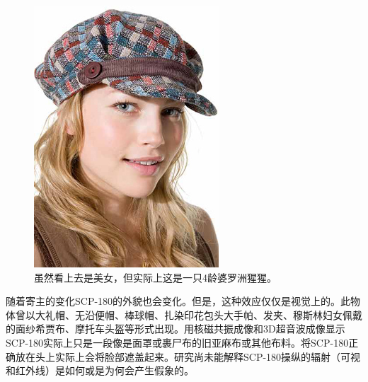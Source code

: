 \begin{figure}[H]
    \centering
    \includegraphics[width=0.5\linewidth]{images/SCP-180-2.jpg}
    \caption*{虽然看上去是美女，但实际上这是一只4龄婆罗洲猩猩。}
\end{figure}

随着寄主的变化SCP-180的外貌也会变化。但是，这种效应仅仅是视觉上的。此物体曾以大礼帽、无沿便帽、棒球帽、扎染印花包头大手帕、发夹、穆斯林妇女佩戴的面纱希贾布、摩托车头盔等形式出现。用核磁共振成像和3D超音波成像显示SCP-180实际上只是一段像是面罩或裹尸布的旧亚麻布或其他布料。将SCP-180正确放在头上实际上会将脸部遮盖起来。研究尚未能解释SCP-180操纵的辐射（可视和红外线）是如何或是为何会产生假象的。
